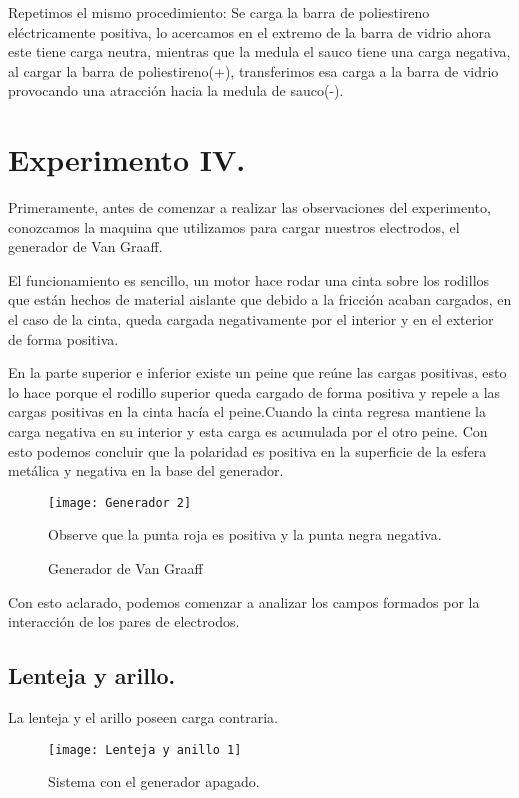 \documentclass[14pt]{article}
\begin{document}
\begin{multicols}{2}
Repetimos el mismo procedimiento:
Se carga la barra de poliestireno eléctricamente positiva, lo acercamos en el extremo de la barra de vidrio ahora este tiene carga neutra, mientras que la medula el sauco tiene una carga negativa, al cargar la barra de poliestireno(+), transferimos esa carga a la barra de vidrio provocando una atracción hacia la medula de sauco(-).
\section{Experimento IV.}

Primeramente, antes de comenzar a realizar las observaciones del experimento, conozcamos la maquina que utilizamos para cargar nuestros electrodos, el generador de Van Graaff.

El funcionamiento es sencillo, un motor hace rodar una cinta sobre los rodillos que están hechos de material aislante que debido a la fricción acaban cargados, en el caso de la cinta, queda cargada negativamente por el interior y en el exterior de forma positiva.

En la parte superior e inferior existe un peine que reúne las cargas positivas, esto lo hace porque el rodillo superior queda cargado de forma positiva y repele a las cargas positivas en la cinta hacía el peine.Cuando la cinta regresa mantiene la carga negativa en su interior y esta carga es acumulada por el otro peine. Con esto podemos concluir que la polaridad es positiva en la superficie de la esfera metálica y negativa en la base del generador.

\begin{figure}[h!]
	\centering
	\texttt{[image: Generador 2]}
	\caption{Generador de Van Graaff}
	\label{fig:Generador}
	Observe que la punta roja es positiva y la punta negra negativa.
\end{figure}

Con esto aclarado, podemos comenzar a analizar los campos formados por la interacción de los pares de electrodos.


\subsection{Lenteja y arillo.}



La lenteja y el arillo poseen carga contraria.

\begin{figure}[h!]
	\centering
	\texttt{[image: Lenteja y anillo 1]}
	\caption{Sistema con el generador apagado.}
	\label{fig:AyLO}
\end{figure}



\end{multicols}
\end{document}
